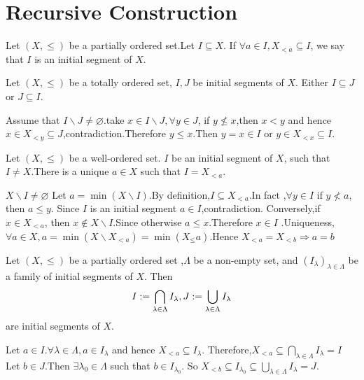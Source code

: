 \documentclass{book}
\numberwithin{equation}{section}
\begin{document}
\section{Recursive Construction}
\begin{definitionenv}
    Let $(X,\le)$ be a partially ordered set.Let $I\subseteq X$. If $\forall a\in I ,X_{<a}\subseteq I$, we say that $I$ is an initial segment of $X$. 
\end{definitionenv}
\begin{propositionenv}
    Let $(X,\le)$ be a totally ordered set, $I,J$ be initial segments of $X$. Either $I\subseteq J$ or $J\subseteq I$.
\end{propositionenv}
\begin{proofenv}
    Assume that $I\backslash J\not=\varnothing$.take $x\in I\backslash J,\forall y\in J$, if $y\not\le x $,then $x<y$ and hence $x\in X_{<y}\subseteq J$,contradiction.Therefore $y\le x$.Then $y=x\in I$ or $y\in X_{<x}\subseteq I$.
\end{proofenv}
\begin{propositionenv}
    Let $(X,\le)$ be a well-ordered set. $I$ be an initial segment of $X$, such that $I\not=X$.There is a unique $a\in X$ such that $I=X_{<a}$.
\end{propositionenv}
\begin{proofenv}
    $X\backslash I\not=\varnothing$ Let $a=\min (X\backslash I)$.By definition,$I\subseteq X_{<a}$.In fact ,$\forall y\in I$ if $y\not< a $, then $a\le y$.
    Since $I$ is an initial segment $a\in I$,contradiction.
    \newline
    Conversely,if $x\in X_{<a}$, then $x\notin X\backslash I$.Since otherwise $a\le x$.Therefore $x\in I$ .Uniqueness,$\forall a\in X,a=\min(X\backslash X_{<a})=\min(X_\leq a)$.Hence $X_{<a}=X_{<b}\Rightarrow a=b$
\end{proofenv}
\begin{propositionenv}
    Let $(X,\le)$ be a partially ordered set ,$\Lambda$ be a non-empty set, and $(I_\lambda)_{\lambda\in \Lambda}$ be a family of initial segments of $X$. Then 
    $$I:=\bigcap_{\lambda\in \Lambda}I_\lambda,\space J:=\bigcup_{\lambda\in \Lambda}I_\lambda$$ are initial segments of $X$.
\end{propositionenv}
\begin{proofenv}
    \quad
    \newline
    Let $a\in I.\forall \lambda\in \Lambda,a\in I_\lambda$ and hence $X_{<a}\subseteq I_\lambda$. Therefore,$X_{<a}\subseteq\bigcap_{\lambda\in\Lambda}I_\lambda=I$
    \newline
    Let $b\in J$.Then $\exists \lambda_0\in \Lambda$ such that $b\in I_{\lambda_0}$. So $X_{<b}\subseteq I_{\lambda_0}\subseteq \bigcup_{\lambda\in \Lambda}I_\lambda=J$. 
\end{proofenv}
\end{document}
